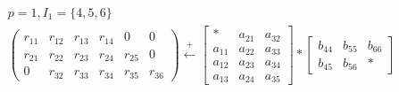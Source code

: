 \begin{eqnarray*}
  p=1, I_1=\{4,5,6\}\\
  \left(\begin{array}{cccccc}
    r_{11} &r_{12} &r_{13}& r_{14} & 0 & 0\\
    r_{21} &r_{22} &r_{23}& r_{24} & r_{25} & 0\\
    0 &r_{32} &r_{33}& r_{34} & r_{35} & r_{36}
  \end{array}\right) \stackrel{+}{\longleftarrow}
\left[
  \begin{array}{ccc}
    *     & a_{21} & a_{32}  \\
    a_{11} & a_{22} & a_{33} \\
    a_{12} & a_{23} & a_{34} \\
    a_{13} & a_{24} & a_{35}
  \end{array}
\right]*
\left[
  \begin{array}{ccc}
    b_{44} & b_{55} & b_{66} \\
    b_{45} & b_{56} & * 
  \end{array}
\right]
\end{eqnarray*}

